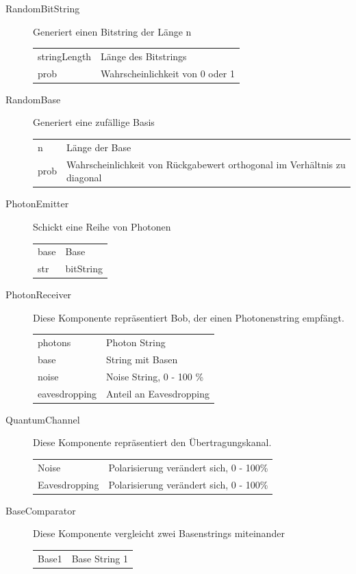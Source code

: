 \documentclass[a4paper,10.2pt,pdftex]{scrartcl}%
\begin{document}
\begin{description} 
\item[RandomBitString] Generiert einen Bitstring der Länge n \\
\begin{tabular}{p{3cm}p{9cm}}
stringLength & Länge des Bitstrings \\
prob & Wahrscheinlichkeit von 0 oder 1 \\
\end{tabular}
\item[RandomBase]  Generiert eine zufällige Basis \\
\begin{tabular}{p{3cm}p{7.5cm}}
n & Länge der Base \\    
prob & Wahrscheinlichkeit von Rückgabewert orthogonal im Verhältnis zu diagonal
\end{tabular} 
\item[PhotonEmitter] Schickt eine Reihe von Photonen  \\
\begin{tabular}{p{3cm}p{9cm}}
base & Base \\
str & bitString \\  
\end{tabular}
\item[PhotonReceiver]
Diese Komponente repräsentiert Bob, der einen Photonenstring empfängt.  \\
\begin{tabular}{p{3cm}p{7.5cm}}
photons & Photon String   \\
base  & String mit Basen  \\
noise &  Noise String, 0 - 100  \% \\ 
eavesdropping  & Anteil an Eavesdropping 
\end{tabular} 
\item[QuantumChannel] 
Diese Komponente repräsentiert den Übertragungskanal. \\
\begin{tabular}{p{3cm}p{7.5cm}}
Noise  & Polarisierung verändert sich, 0 - 100\% \\
Eavesdropping & Polarisierung verändert sich, 0 - 100\% \\
\end{tabular} 
\item[BaseComparator] Diese Komponente vergleicht zwei Basenstrings miteinander \\  \begin{tabular}{p{3cm}p{9cm}}
Base1 & Base String 1   \\

\end{tabular}
\end{description}
\end{document}
